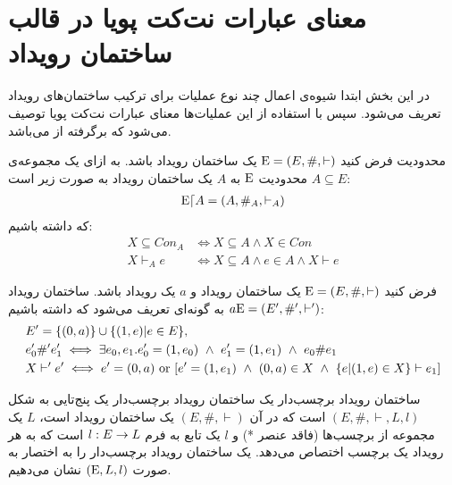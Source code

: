 \section{معنای عبارات نت‌کت پویا در قالب ساختمان رویداد}
در این بخش ابتدا شیوه‌ی اعمال چند نوع عملیات برای ترکیب ساختمان‌های رویداد تعریف می‌شود.
سپس با استفاده از این عملیات‌ها معنای عبارات نت‌کت پویا توصیف می‌شود که برگرفته از
\cite{es}
می‌باشد.

\begin{definition}{محدودیت}
    فرض کنید
    $\mathrm{E} = (E,\#,\vdash)$
    یک ساختمان رویداد باشد.
    به ازای یک مجموعه‌ی
    $A \subseteq E$
    محدودیت
    $\mathrm{E}$
    به
    $A$
    یک ساختمان رویداد به صورت زیر است:
    \begin{align*}
        \mathrm{E} \lceil A = (A,\#_A,\vdash_A)
    \end{align*}
    که داشته باشیم:
    \begin{align*}
        X \subseteq Con_A & \iff X \subseteq A \wedge X \in Con                 \\
        X \vdash_A e      & \iff X \subseteq A \wedge e \in A \wedge X \vdash e
    \end{align*}
\end{definition}

\begin{definition}
    فرض کنید
    $\mathrm{E} = (E,\#,\vdash)$
    یک ساختمان رویداد و
    $a$
    یک رویداد باشد.
    ساختمان رویداد
    $a\mathrm{E} = (E',\#',\vdash')$
    به گونه‌ای تعریف می‌شود که داشته باشیم:
    \begin{align*}
         & E' = \s{(0,a)} \cup \s{(1,e)|e \in E},                                                                               \\
         & e_0' \#' e_1'  \iff \exists e_0,e_1.e_0' = (1,e_0)
        \ \wedge \ e_1' = (1,e_1) \ \wedge \ e_0 \# e_1                                                                         \\
         & X \vdash' e' \iff e' = (0,a) \text{ or } [e' = (1,e_1) \ \wedge \ (0,a)\in X \ \wedge \ \s{e|(1,e)\in X} \vdash e_1]
    \end{align*}
\end{definition}

\begin{definition}{ساختمان رویداد برچسب‌دار}
    یک ساختمان رویداد برچسب‌دار
    یک پنج‌تایی به شکل
    $(E,\#,\vdash,L,l)$
    است که در آن
    $(E,\#,\vdash)$
    یک ساختمان رویداد است،
    $L$
    یک مجموعه از برچسب‌ها
    (فاقد عنصر *)
    و
    $l$
    یک تابع به فرم
    $l: E \rightarrow L$
    است که به هر رویداد یک برچسب اختصاص می‌دهد.
    یک ساختمان رویداد برچسب‌دار را به اختصار به صورت
    $(\mathrm{E},L,l)$
    نشان می‌دهیم.
\end{definition}

